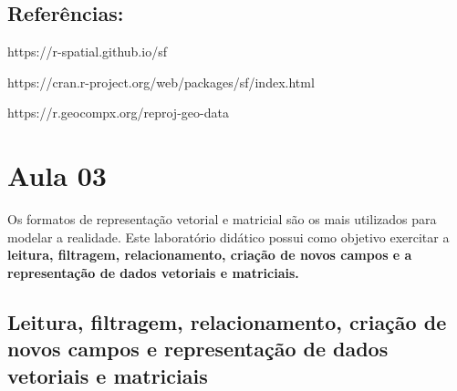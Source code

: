 \documentclass[
  letterpaper,
  DIV=11,
  numbers=noendperiod]{scrreprt}
\newenvironment{Shaded}{\begin{snugshade}}{\end{snugshade}}
\newcommand{\CommentTok}[1]{\textcolor[rgb]{0.37,0.37,0.37}{#1}}
\newcommand{\DecValTok}[1]{\textcolor[rgb]{0.68,0.00,0.00}{#1}}
\newcommand{\FunctionTok}[1]{\textcolor[rgb]{0.28,0.35,0.67}{#1}}
\newcommand{\NormalTok}[1]{\textcolor[rgb]{0.00,0.23,0.31}{#1}}
\newcommand{\OtherTok}[1]{\textcolor[rgb]{0.00,0.23,0.31}{#1}}
\newcommand{\SpecialCharTok}[1]{\textcolor[rgb]{0.37,0.37,0.37}{#1}}
\newcommand{\StringTok}[1]{\textcolor[rgb]{0.13,0.47,0.30}{#1}}
\begin{document}
\begin{Shaded}
\end{Shaded}

\section{Referências:}\label{referuxeancias-1}

https://r-spatial.github.io/sf

https://cran.r-project.org/web/packages/sf/index.html

https://r.geocompx.org/reproj-geo-data


\chapter{Aula 03}\label{aula-03}

Os formatos de representação vetorial e matricial são os mais utilizados
para modelar a realidade. Este laboratório didático possui como objetivo
exercitar a \textbf{leitura, filtragem, relacionamento, criação de novos
campos e a representação de dados vetoriais e matriciais.}

\section{\texorpdfstring{\textbf{Leitura, filtragem, relacionamento,
criação de novos campos e representação de dados vetoriais e
matriciais}}{Leitura, filtragem, relacionamento, criação de novos campos e representação de dados vetoriais e matriciais}}\label{leitura-filtragem-relacionamento-criauxe7uxe3o-de-novos-campos-e-representauxe7uxe3o-de-dados-vetoriais-e-matriciais}
\end{document}
